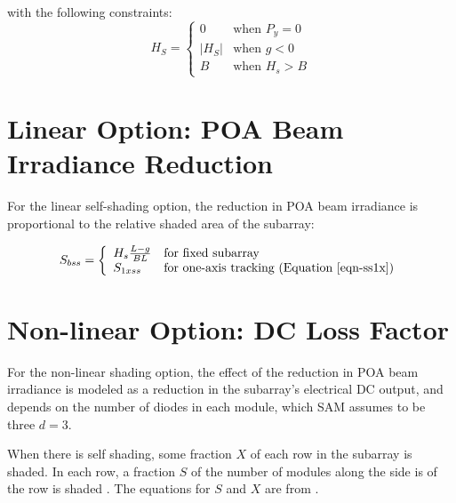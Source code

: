 \documentclass[12pt,letterpaper]{article}
\begin{document}
with the following constraints: 
\[
H_S=
  \left\{
    \begin{array}{ll}
      0                      & \mbox{when $P_y=0$}\\
      \lvert H_S \rvert & \mbox{when $g<0$}\\
      B                     & \mbox{when $H_s>B$}
    \end{array}
  \right.
\]

\section{Linear Option: POA Beam Irradiance Reduction} \label{sec-selfshadlinear}

For the linear self-shading option, the reduction in POA beam irradiance is proportional to the relative shaded area of the subarray:

\begin{equation}\label{eqn-ssbeam}
S_{bss} = 
	\left\{
	\begin{array}{ll}
		H_s\frac{L-g}{B L}&\mbox{for fixed subarray}\\
		S_{1xss}&\mbox{for one-axis tracking (Equation~\ref{eqn-ss1x})}
	\end{array}
	\right.
\end{equation}

\section{Non-linear Option: DC Loss Factor} \label{sec-selfshaddc}

For the non-linear shading option, the effect of the reduction in POA beam irradiance is modeled as a reduction in the subarray's electrical DC output, and depends on the number of diodes in each module, which SAM assumes to be three $d=3$.

When there is self shading, some fraction $X$ of each row in the subarray is shaded. In each row, a fraction $S$ of the number of modules along the side is of the row is shaded \citep{deline2013a}. The equations for $S$ and $X$ are from \citet{deline2013b}.
\end{document}
